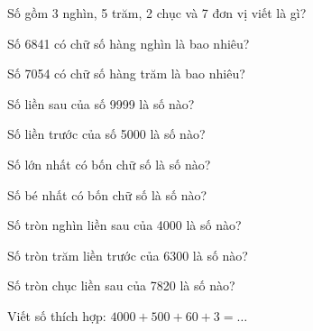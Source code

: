 \begin{ex}
Số gồm 3 nghìn, 5 trăm, 2 chục và 7 đơn vị viết là gì?
\end{ex}

\begin{ex}
Số 6841 có chữ số hàng nghìn là bao nhiêu?
\end{ex}

\begin{ex}
Số 7054 có chữ số hàng trăm là bao nhiêu?
\end{ex}

\begin{ex}
Số liền sau của số 9999 là số nào?
\end{ex}

\begin{ex}
Số liền trước của số 5000 là số nào?
\end{ex}

\begin{ex}
Số lớn nhất có bốn chữ số là số nào?
\end{ex}

\begin{ex}
Số bé nhất có bốn chữ số là số nào?
\end{ex}

\begin{ex}
Số tròn nghìn liền sau của 4000 là số nào?
\end{ex}

\begin{ex}
Số tròn trăm liền trước của 6300 là số nào?
\end{ex}

\begin{ex}
Số tròn chục liền sau của 7820 là số nào?
\end{ex}

\begin{ex}
Viết số thích hợp: $4000 + 500 + 60 + 3 = \dots$
\end{ex}


